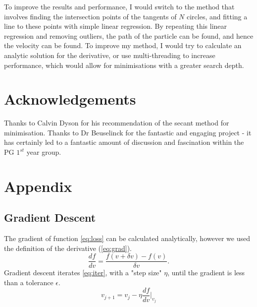 \documentclass[11pt]{article}
\begin{document}
To improve the results and performance, I would switch to the method that involves finding the intersection points of the tangents of $N$ circles, and fitting a line to these points with simple linear regression. By repeating this linear regression and removing outliers, the path of the particle can be found, and hence the velocity can be found. To improve my method, I would try to calculate an analytic solution for the derivative, or use multi-threading to increase performance, which would allow for minimisations with a greater search depth.

\section{Acknowledgements}
\label{sec:acknowledgements}
Thanks to Calvin Dyson for his recommendation of the secant method for minimisation. Thanks to Dr Beuselinck for the fantastic and engaging project - it has certainly led to a fantastic amount of discussion and fascination within the PG $1^{st}$ year group.


\printbibliography

\appendix
\section{Appendix}
\subsection{Gradient Descent}
\label{app:gradient-descent}
The gradient of function \autoref{eq:loss} can be calculated analytically, however we used the definition of the derivative (\autoref{eq:grad}).
\begin{equation}
    \frac{df}{dv} = \frac{f(v + \delta v) - f(v)}{\delta v}.
    \label{eq:grad}
\end{equation}
Gradient descent iterates \autoref{eq:iter}, with a "step size" $\eta$, until the gradient is less than a tolerance $\epsilon$.
\begin{equation}
    v_{j+1} = v_j - \eta \frac{df}{dv}\Bigr|_{v_j}
    \label{eq:iter}
\end{equation}
\end{document}
